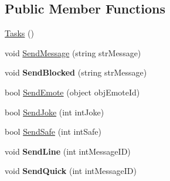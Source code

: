 \subsection*{Public Member Functions}
\begin{DoxyCompactItemize}
\item 
\hyperlink{classSharpenguin_1_1Tasks_ad11714a7d933773ab18d4bb2585edeee}{Tasks} ()
\item 
void \hyperlink{classSharpenguin_1_1Tasks_aded18ef49c423a750812df9dad65347f}{Send\-Message} (string str\-Message)
\item 
\hypertarget{classSharpenguin_1_1Tasks_abf3a4f9bdb323896e55c599a05f5eac8}{void {\bfseries Send\-Blocked} (string str\-Message)}\label{classSharpenguin_1_1Tasks_abf3a4f9bdb323896e55c599a05f5eac8}

\item 
bool \hyperlink{classSharpenguin_1_1Tasks_a2c6d78357cc26cb67b0f8af7872adb19}{Send\-Emote} (object obj\-Emote\-Id)
\item 
bool \hyperlink{classSharpenguin_1_1Tasks_acdb6387b11485a7e14c70dd421c76388}{Send\-Joke} (int int\-Joke)
\item 
bool \hyperlink{classSharpenguin_1_1Tasks_a1226e45b3561d9a0ab01575ad70a3622}{Send\-Safe} (int int\-Safe)
\item 
\hypertarget{classSharpenguin_1_1Tasks_a0fe79158b2c170853d3708449e9b0a3b}{void {\bfseries Send\-Line} (int int\-Message\-I\-D)}\label{classSharpenguin_1_1Tasks_a0fe79158b2c170853d3708449e9b0a3b}

\item 
\hypertarget{classSharpenguin_1_1Tasks_ad46067f2d4d94523038001511eb0a733}{void {\bfseries Send\-Quick} (int int\-Message\-I\-D)}\label{classSharpenguin_1_1Tasks_ad46067f2d4d94523038001511eb0a733}


\end{DoxyCompactItemize}
